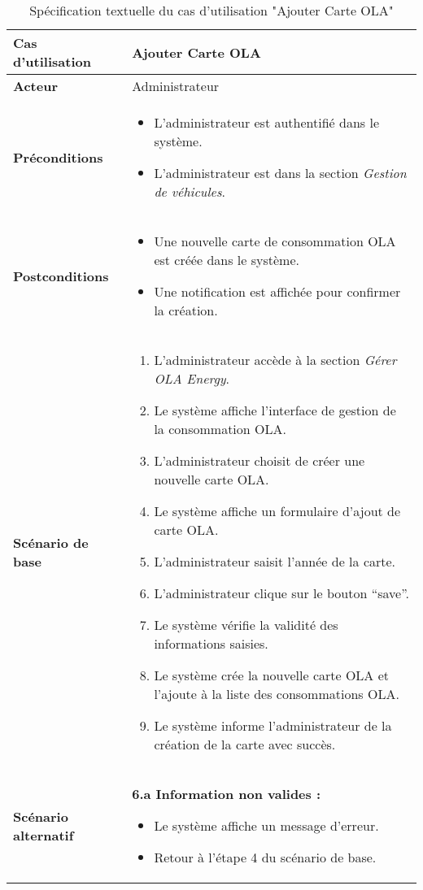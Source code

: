 \documentclass[a4paper,11pt]{report}
\begin{document}
\begin{table}[H]
  \centering
  \renewcommand{\arraystretch}{1.5}
  \caption{Spécification textuelle du cas d'utilisation "Ajouter Carte OLA"}
  \begin{tabularx}{\textwidth}{|l|X|}
    \hline
    \textbf{Cas d'utilisation} & Ajouter Carte OLA \\ \hline
    \textbf{Acteur} & Administrateur \\ \hline
    \textbf{Préconditions} & 
    \begin{itemize}
      \item L’administrateur est authentifié dans le système.
      \item L’administrateur est dans la section \textit{Gestion de véhicules}.
    \end{itemize} \\ \hline
    \textbf{Postconditions} & 
    \begin{itemize}
      \item Une nouvelle carte de consommation OLA est créée dans le système.
      \item Une notification est affichée pour confirmer la création.
    \end{itemize} \\ \hline
    \textbf{Scénario de base} & 
    \begin{enumerate}
      \item L’administrateur accède à la section \textit{Gérer OLA Energy}.
      \item Le système affiche l’interface de gestion de la consommation OLA.
      \item L’administrateur choisit de créer une nouvelle carte OLA.
      \item Le système affiche un formulaire d’ajout de carte OLA.
      \item L’administrateur saisit l’année de la carte.
      \item L’administrateur clique sur le bouton “save”.
      \item Le système vérifie la validité des informations saisies.
      \item Le système crée la nouvelle carte OLA et l’ajoute à la liste des consommations OLA.
      \item Le système informe l’administrateur de la création de la carte avec succès.
    \end{enumerate} \\ \hline
    \textbf{Scénario alternatif} & 
    \textbf{6.a Information non valides :}
    \begin{itemize}
      \item Le système affiche un message d’erreur.
      \item Retour à l’étape 4 du scénario de base.
    \end{itemize} \\ \hline
  \end{tabularx}
\end{table}
\end{document}
